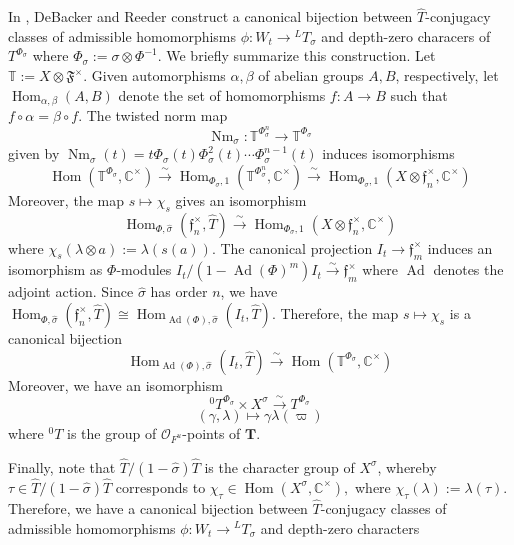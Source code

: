 \documentclass[11pt]{amsart}
\theoremstyle{plain}
\theoremstyle{definition}
\DeclareMathOperator{\Ad}{Ad}
\DeclareMathOperator{\Nm}{Nm}
\DeclareMathOperator{\Hom}{Hom}
\begin{document}
In \cite[Chapter 4]{debackerreeder}, DeBacker and Reeder construct a
canonical bijection between $\hat{T}$-conjugacy classes of admissible
homomorphisms $\phi : W_t \rightarrow {}^L T_{\sigma}$ and depth-zero
characers of $T^{\Phi_{\sigma}}$ where
$\Phi_{\sigma} := \sigma \otimes \Phi^{-1}$.  We briefly summarize
this construction. Let $\mathbb{T} := X \otimes \mathfrak{F}^\times$.
Given automorphisms $\alpha, \beta$ of abelian groups $A,B$,
respectively, let $\Hom_{\alpha, \beta}(A,B)$ denote the set of
homomorphisms $f : A \rightarrow B$ such that $f \circ \alpha = \beta \circ f$.
The twisted norm map
$$\Nm_{\sigma} : \mathbb{T}^{\Phi_{\sigma}^n} \rightarrow \mathbb{T}^{\Phi_{\sigma}}$$
given by
$\Nm_{\sigma}(t) = t \Phi_{\sigma}(t) \Phi_{\sigma}^2(t) \cdots \Phi_{\sigma}^{n-1}(t)$
induces isomorphisms
$$\Hom(\mathbb{T}^{\Phi_{\sigma}},
  \mathbb{C}^\times) \stackrel{\sim}{\rightarrow}
  \Hom_{\Phi_{\sigma}, 1}(\mathbb{T}^{\Phi_{\sigma}^n},
  \mathbb{C}^\times) \stackrel{\sim}{\rightarrow}
  \Hom_{\Phi_{\sigma}, 1}(X \otimes \mathfrak{f}_n^\times, \mathbb{C}^\times)$$
Moreover, the map $s \mapsto \chi_s$ gives an isomorphism
$$\Hom_{\Phi, \hat{\sigma}}(\mathfrak{f}_n^\times, \hat{T})
  \stackrel{\sim}{\rightarrow} \Hom_{\Phi_{\sigma},
  1}(X \otimes \mathfrak{f}_n^\times, \mathbb{C}^\times)$$
where $\chi_s(\lambda \otimes a) := \lambda(s(a))$.  The canonical
projection $I_t \rightarrow \mathfrak{f}_m^\times$ induces an isomorphism
as $\Phi$-modules
$I_t / (1 - \Ad (\Phi)^m)I_t \stackrel{\sim}{\rightarrow} \mathfrak{f}_m^\times$
where $\Ad$ denotes the adjoint action.  Since $\hat{\sigma}$ has order
$n$, we have $\Hom_{\Phi, \hat{\sigma}}(\mathfrak{f}_n^\times,
\hat{T}) \cong \Hom_{\Ad(\Phi), \hat{\sigma}}(I_t, \hat{T})$.
Therefore, the map $s \mapsto \chi_s$ is a canonical bijection
$$\Hom_{\Ad(\Phi), \hat{\sigma}}(I_t, \hat{T})
  \stackrel{\sim}{\rightarrow} \Hom(\mathbb{T}^{\Phi_{\sigma}},
  \mathbb{C}^\times)$$
Moreover, we have an isomorphism
$${}^0T^{\Phi_{\sigma}} \times X^{\sigma} \stackrel{\sim}{\rightarrow}
  T^{\Phi_{\sigma}}$$ $$(\gamma, \lambda) \mapsto \gamma \lambda(\varpi)$$
where ${}^0 T$ is the group of $\mathcal{O}_{F^u}$-points of $\mathbf{T}$.

Finally, note that $\hat{T} / (1 - \hat{\sigma}) \hat{T}$ is the
character group of $X^{\sigma}$, whereby
$\tau \in \hat{T} / (1 - \hat{\sigma}) \hat{T}$ corresponds to
$\chi_{\tau} \in \Hom(X^{\sigma}, \mathbb{C}^\times),$ where
$\chi_{\tau}(\lambda) := \lambda(\tau)$.  Therefore, we have a
canonical bijection between $\hat{T}$-conjugacy classes of admissible
homomorphisms $\phi : W_t \rightarrow {}^L T_{\sigma}$ and depth-zero
characters
\end{document}
